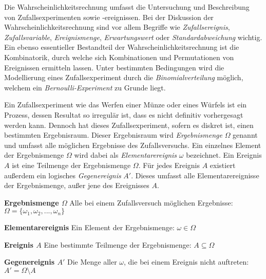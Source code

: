 



\thispagestyle{plain}


Die Wahrscheinlichkeitsrechnung umfasst die Untersuchung und Beschreibung von Zufallsexperimenten sowie -ereignissen. Bei der Diskussion der Wahrscheinlichkeitsrechnung sind vor allem Begriffe wie \emph{Zufallsereignis}, \emph{Zufallsvariable}, \emph{Ereignismenge}, \emph{Erwartungswert} oder \emph{Standardabweichung} wichtig. Ein ebenso essentieller Bestandteil der Wahrscheinlichkeitsrechnung ist die Kombinatorik, durch welche sich Kombinationen und Permutationen von Ereignissen ermitteln lassen. Unter bestimmten Bedingungen wird die Modellierung eines Zufallsexperiment durch die \emph{Binomialverteilung} m\"{o}glich, welchem ein \emph{Bernoulli-Experiment} zu Grunde liegt. 


Ein Zufallsexperiment wie das Werfen einer M\"{u}nze oder eines W\"{u}rfels ist ein Prozess, dessen Resultat so irregul\"{a}r ist, dass es nicht definitiv vorhergesagt werden kann. Dennoch hat dieses Zufallsexperiment, sofern es diskret ist, einen bestimmten Ergebnisraum. Dieser Ergebnisraum wird \emph{Ergebnismenge} $\Omega$ genannt und umfasst alle m\"{o}glichen Ergebnisse des Zufallsversuchs. Ein einzelnes Element der Ergebnismenge $\Omega$ wird dabei als \emph{Elementarereignis} $\omega$ bezeichnet. Ein Ereignis $A$ ist eine Teilmenge der Ergebnismenge $\Omega$. F\"{u}r jedes Ereignis $A$ existiert au\ss{}erdem ein logisches \emph{Gegenereignis} $A'$. Dieses umfasst alle Elementarereignisse der Ergebnismenge, au\ss{}er jene des Ereignisses $A$. 

\textbf{Ergebnismenge $\Omega$}  Alle bei einem Zufallsversuch m\"{o}glichen Ergebnisse: $\Omega = \{ \omega_1, \omega_2, ..., \omega_n\}$

\textbf{Elementarereignis}  Ein Element der Ergebnismenge: $\omega \in \Omega$

\textbf{Ereignis $A$}  Eine bestimmte Teilmenge der Ergebnismenge: $A \subseteq \Omega$

\textbf{Gegenereignis $A'$}  Die Menge aller $\omega$, die bei einem Ereignis nicht auftreten: $A' = \Omega \setminus A$


